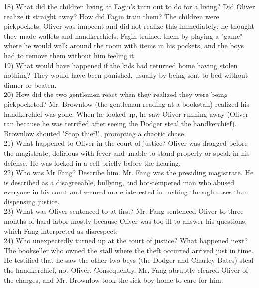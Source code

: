 \documentclass[12pt]{article}
\begin{document}
18) What did the children living at Fagin’s turn out to do for a living? Did Oliver realize it straight away? How did Fagin train them? The children were pickpockets. Oliver was innocent and did not realize this immediately; he thought they made wallets and handkerchiefs. Fagin trained them by playing a "game" where he would walk around the room with items in his pockets, and the boys had to remove them without him feeling it. \\
19) What would have happened if the kids had returned home having stolen nothing? They would have been punished, usually by being sent to bed without dinner or beaten. \\
20) How did the two gentlemen react when they realized they were being pickpocketed? Mr. Brownlow (the gentleman reading at a bookstall) realized his handkerchief was gone. When he looked up, he saw Oliver running away (Oliver ran because he was terrified after seeing the Dodger steal the handkerchief). Brownlow shouted "Stop thief!", prompting a chaotic chase. \\
21) What happened to Oliver in the court of justice? Oliver was dragged before the magistrate, delirious with fever and unable to stand properly or speak in his defense. He was locked in a cell briefly before the hearing. \\
22) Who was Mr Fang? Describe him. Mr. Fang was the presiding magistrate. He is described as a disagreeable, bullying, and hot-tempered man who abused everyone in his court and seemed more interested in rushing through cases than dispensing justice. \\
23) What was Oliver sentenced to at first? Mr. Fang sentenced Oliver to three months of hard labor mostly because Oliver was too ill to answer his questions, which Fang interpreted as disrespect. \\
24) Who unexpectedly turned up at the court of justice? What happened next? The bookseller who owned the stall where the theft occurred arrived just in time. He testified that he saw the other two boys (the Dodger and Charley Bates) steal the handkerchief, not Oliver. Consequently, Mr. Fang abruptly cleared Oliver of the charges, and Mr. Brownlow took the sick boy home to care for him.
\end{document}

